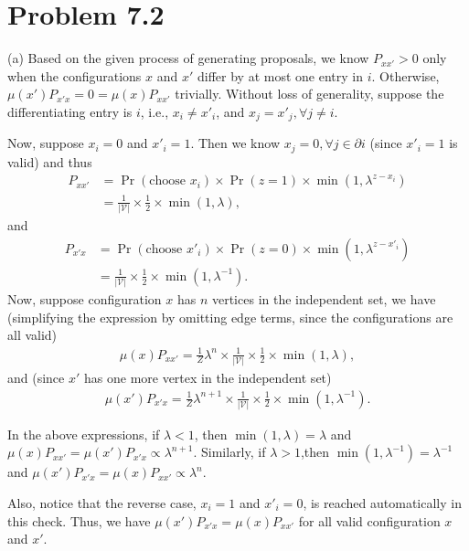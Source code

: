 \documentclass{article}
\newcommand{\qeds}{\hfill\qedsymbol}
\begin{document}
\pagebreak
\section*{Problem 7.2}
(a) 
%
Based on the given process of generating proposals, we know
$P_{xx'} > 0$ only when the configurations $x$ and $x'$ differ by at most one entry in $i$. Otherwise, $\mu(x')P_{x'x} = 0 = \mu(x)P_{xx'}$ trivially. Without loss of generality, suppose the differentiating entry is $i$, i.e., $x_i \neq x'_i$, and $x_j = x'_j, \forall j \neq i$.
%

Now, suppose $x_i = 0$ and $x'_i = 1$. Then we know $x_j=0, \forall j \in \partial i$ (since $x'_i = 1$ is valid) and thus
\begin{align*}
	P_{xx'} &= \Pr(\text{choose $x_i$}) \times \Pr(z = 1) \times \min(1, \lambda^{z - x_i})\\
	&= \frac{1}{|\mathscr{V}|}\times\frac{1}{2} \times \min(1, \lambda),
\end{align*}
and
\begin{align*}
	P_{x'x} &= \Pr(\text{choose $x'_i$}) \times \Pr(z = 0) \times \min(1, \lambda^{z - x'_i})\\ 
	&= \frac{1}{|\mathscr{V}|}\times \frac{1}{2} \times \min(1, \lambda^{-1}).
\end{align*}
%
Now, suppose configuration $x$ has $n$ vertices in the independent set, we have (simplifying the expression by omitting edge terms, since the configurations are all valid)
\begin{align*}
	\mu(x)P_{xx'} = \frac{1}{Z} \lambda^{n} \times \frac{1}{|\mathscr{V}|}\times\frac{1}{2} \times \min(1, \lambda),
\end{align*}
and (since $x'$ has one more vertex in the independent set)
\begin{align*}
	\mu(x')P_{x'x} = \frac{1}{Z} \lambda^{n+1} \times \frac{1}{|\mathscr{V}|}\times\frac{1}{2} \times \min(1, \lambda^{-1}).
\end{align*}

In the above expressions, if $\lambda < 1$, then $\min(1, \lambda) = \lambda$ and $\mu(x)P_{xx'} = \mu(x')P_{x'x}\propto\lambda^{n+1}$. Similarly, if $\lambda > 1$,then  $\min(1, \lambda^{-1}) = \lambda^{-1}$ and $\mu(x')P_{x'x} = \mu(x)P_{xx'} \propto\lambda^{n}$.
%

Also, notice that the reverse case, $x_i = 1$ and $x'_i = 0$, is reached automatically in this check. Thus, we have $\mu(x')P_{x'x} = \mu(x)P_{xx'}$ for all valid configuration $x$ and $x'$. \qeds
\\
\end{document}
